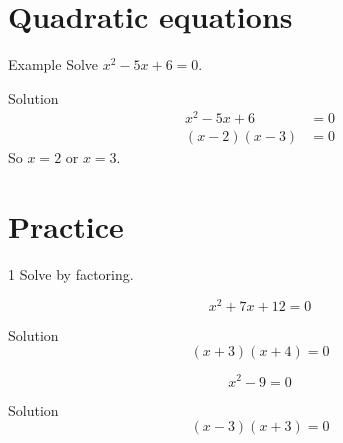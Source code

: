 \documentclass[11pt]{article}
\title{#1}\author{#2}\date{}%
\begin{document}

\section*{Quadratic equations}

\begin{clexample}{Example}{}
Solve \(x^{2} - 5x + 6 = 0\).

\begin{clsolution}{Solution}
\begin{align*}
x^{2} - 5x + 6 &= 0 \\
(x - 2)(x - 3) &= 0
\end{align*}
So \(x = 2\) or \(x = 3\).

\end{clsolution}
\end{clexample}

\section*{Practice}

\begin{clproblem}{1}{}
Solve by factoring.

\begin{clparts}
\item
\[
x^{2} + 7x + 12 = 0
\]
\begin{clsolution}{Solution}
\[
(x + 3)(x + 4) = 0
\]
\end{clsolution}
\item
\[
x^{2} - 9 = 0
\]
\begin{clsolution}{Solution}
\[
(x - 3)(x + 3) = 0
\]
\end{clsolution}
\end{clparts}
\end{clproblem}
\end{document}
